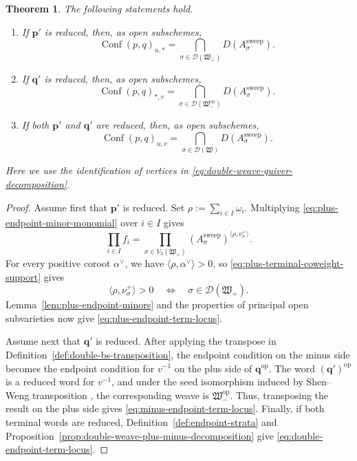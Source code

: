 \documentclass[10pt,a4paper]{article}
\newtheorem{theorem}{Theorem}[section]
\theoremstyle{definition}
\theoremstyle{remark}
\newcommand{\Conf}{\operatorname{Conf}}
\newcommand{\Dcal}{\mathcal D}
\newcommand{\fW}{\mathfrak W}
\begin{document}
\begin{theorem}
\label{thm:endpoint-locus-cluster-variables}
The following statements hold.
\begin{enumerate}
\item If \(\mathbf p'\) is reduced, then, as open subschemes,
\begin{equation}
 \Conf(p,q)_{u,*}
 =\bigcap_{\sigma\in\Dcal(\fW_+)}
   D\left(A_\sigma^{\mathrm{sweep}}\right).
 \label{eq:plus-endpoint-term-locus}
\end{equation}
\item If \(\mathbf q'\) is reduced, then, as open subschemes,
\begin{equation}
 \Conf(p,q)_{*,v}
 =\bigcap_{\sigma\in\Dcal(\fW_-^{\mathrm{op}})}
   D\left(A_\sigma^{\mathrm{sweep}}\right).
 \label{eq:minus-endpoint-term-locus}
\end{equation}
\item If both \(\mathbf p'\) and \(\mathbf q'\) are reduced, then, as open
subschemes,
\begin{equation}
 \Conf(p,q)_{u,v}
 =\bigcap_{\sigma\in\Dcal(\fW)}
   D\left(A_\sigma^{\mathrm{sweep}}\right).
 \label{eq:double-endpoint-term-locus}
\end{equation}
\end{enumerate}
Here we use the identification of vertices in
\eqref{eq:double-weave-quiver-decomposition}.
\end{theorem}

\begin{proof}
Assume first that \(\mathbf p'\) is reduced.
Set \(\rho:=\sum_{i\in I}\omega_i\).  Multiplying
\eqref{eq:plus-endpoint-minor-monomial} over \(i\in I\) gives
\[
 \prod_{i\in I}f_i
 =\prod_{\sigma\in V_3(\fW_+)}
   \left(A_\sigma^{\mathrm{sweep}}\right)^{
    \langle\rho,\nu_\sigma^+\rangle}.
\]
For every positive coroot \(\alpha^\vee\), we have
\(\langle\rho,\alpha^\vee\rangle>0\), so
\eqref{eq:plus-terminal-coweight-support} gives
\[
 \langle\rho,\nu_\sigma^+\rangle>0
 \quad\Longleftrightarrow\quad
 \sigma\in\Dcal(\fW_+).
\]
Lemma~\ref{lem:plus-endpoint-minors} and the properties of principal open
subvarieties now give \eqref{eq:plus-endpoint-term-locus}.

Assume next that \(\mathbf q'\) is reduced.  After applying the transpose in
Definition~\ref{def:double-bs-transposition},
the endpoint condition on the minus side becomes the endpoint condition for
\(v^{-1}\) on the plus side of \(\mathbf q^{\mathrm{op}}\).  The word
\((\mathbf q')^{\mathrm{op}}\) is a reduced word for \(v^{-1}\), and under the
seed isomorphism induced by Shen--Weng transposition
\cite[Proposition~3.9]{ShenWeng2021}, the corresponding weave is
\(\fW_-^{\mathrm{op}}\).  Thus, transposing the result on the plus side gives
\eqref{eq:minus-endpoint-term-locus}.  Finally, if both terminal words are
reduced,
Definition~\ref{def:endpoint-strata} and
Proposition~\ref{prop:double-weave-plus-minus-decomposition} give
\eqref{eq:double-endpoint-term-locus}.
\end{proof}
\end{document}
